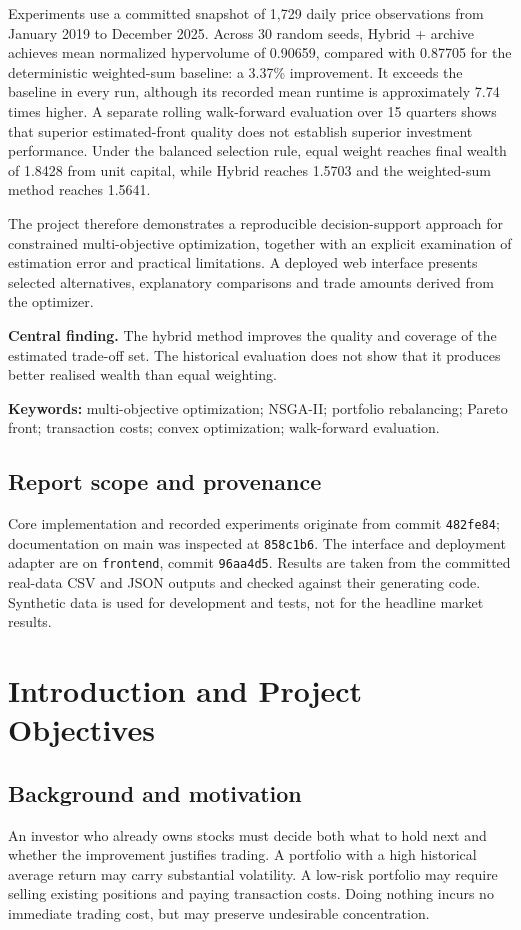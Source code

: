 \documentclass[12pt,a4paper]{article}
\newcommand{\note}[1]{\par\smallskip\noindent\colorbox{light}{\parbox{\dimexpr\linewidth-2\fboxsep}{\small #1}}\par\smallskip}
\begin{document}
Experiments use a committed snapshot of 1,729 daily price observations from January 2019 to December 2025. Across 30 random seeds, Hybrid + archive achieves mean normalized hypervolume of 0.90659, compared with 0.87705 for the deterministic weighted-sum baseline: a 3.37\% improvement. It exceeds the baseline in every run, although its recorded mean runtime is approximately 7.74 times higher. A separate rolling walk-forward evaluation over 15 quarters shows that superior estimated-front quality does not establish superior investment performance. Under the balanced selection rule, equal weight reaches final wealth of 1.8428 from unit capital, while Hybrid reaches 1.5703 and the weighted-sum method reaches 1.5641.

The project therefore demonstrates a reproducible decision-support approach for constrained multi-objective optimization, together with an explicit examination of estimation error and practical limitations. A deployed web interface presents selected alternatives, explanatory comparisons and trade amounts derived from the optimizer.

\note{\textbf{Central finding.} The hybrid method improves the quality and coverage of the estimated trade-off set. The historical evaluation does not show that it produces better realised wealth than equal weighting.}
\vspace{4mm}
\textbf{Keywords:} multi-objective optimization; NSGA-II; portfolio rebalancing; Pareto front; transaction costs; convex optimization; walk-forward evaluation.

\subsection*{Report scope and provenance}
Core implementation and recorded experiments originate from commit \texttt{482fe84}; documentation on main was inspected at \texttt{858c1b6}. The interface and deployment adapter are on \texttt{frontend}, commit \texttt{96aa4d5}. Results are taken from the committed real-data CSV and JSON outputs and checked against their generating code. Synthetic data is used for development and tests, not for the headline market results.

\clearpage\setcounter{tocdepth}{1}\tableofcontents
\clearpage{}
\section{Introduction and Project Objectives}
\subsection{Background and motivation}
An investor who already owns stocks must decide both what to hold next and whether the improvement justifies trading. A portfolio with a high historical average return may carry substantial volatility. A low-risk portfolio may require selling existing positions and paying transaction costs. Doing nothing incurs no immediate trading cost, but may preserve undesirable concentration.
\end{document}
